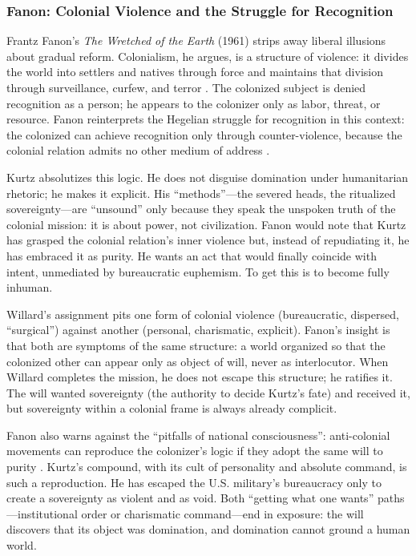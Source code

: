 \subsubsection*{Fanon: Colonial Violence and the Struggle for Recognition}
Frantz Fanon's \textit{The Wretched of the Earth} (1961) strips away liberal illusions about
gradual reform. Colonialism, he argues, is a structure of violence: it divides the world into
settlers and natives through force and maintains that division through surveillance, curfew,
and terror \parencite{FanonWretched2004}. The colonized subject is denied recognition as a
person; he appears to the colonizer only as labor, threat, or resource. Fanon reinterprets the
Hegelian struggle for recognition in this context: the colonized can achieve recognition only
through counter-violence, because the colonial relation admits no other medium of address
\parencite{FanonWretched2004}.

Kurtz absolutizes this logic. He does not disguise domination under humanitarian rhetoric; he
makes it explicit. His ``methods''---the severed heads, the ritualized sovereignty---are
``unsound'' only because they speak the unspoken truth of the colonial mission: it is about
power, not civilization. Fanon would note that Kurtz has grasped the colonial relation's inner
violence but, instead of repudiating it, he has embraced it as purity. He wants an act that
would finally coincide with intent, unmediated by bureaucratic euphemism. To get this is to
become fully inhuman.

Willard's assignment pits one form of colonial violence (bureaucratic, dispersed, ``surgical'')
against another (personal, charismatic, explicit). Fanon's insight is that both are symptoms
of the same structure: a world organized so that the colonized other can appear only as object
of will, never as interlocutor. When Willard completes the mission, he does not escape this
structure; he ratifies it. The will wanted sovereignty (the authority to decide Kurtz's fate)
and received it, but sovereignty within a colonial frame is always already complicit.

Fanon also warns against the ``pitfalls of national consciousness'': anti-colonial movements
can reproduce the colonizer's logic if they adopt the same will to purity
\parencite{FanonWretched2004}. Kurtz's compound, with its cult of personality and absolute
command, is such a reproduction. He has escaped the U.S. military's bureaucracy only to create
a sovereignty as violent and as void. Both ``getting what one wants'' paths---institutional
order or charismatic command---end in exposure: the will discovers that its object was
domination, and domination cannot ground a human world.
